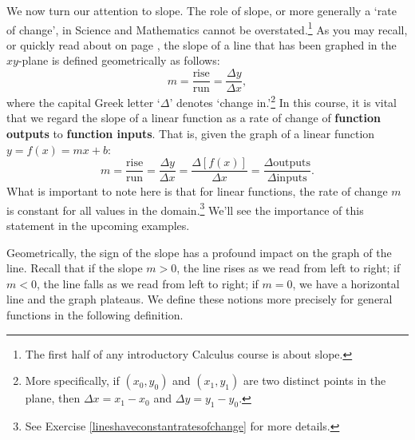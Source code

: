\documentclass{ximera}
\begin{document}
We now turn our attention to slope.  The role of slope, or more generally a `rate of change',  in Science and Mathematics  cannot be overstated.\footnote{The first half of any introductory Calculus course is about slope.} As you may recall, or quickly read about on page \pageref{slope}, the slope of a line that has been graphed in the $xy$-plane is defined geometrically as follows: \[m = \frac{\text{rise}}{\text{run}} = \frac{\Delta y}{\Delta x} ,\] where the capital Greek letter  `$\Delta$' denotes `change in.'\footnote{More specifically, if $(x_{0}, y_{0})$ and $(x_{1}, y_{1})$ are two distinct points in the plane, then $\Delta x = x_{1} - x_{0}$ and $\Delta y = y_{1} - y_{0}$.} In this course, it is vital that we regard the slope of a linear function as a  rate of change of \textbf{function outputs}  to \textbf{function inputs}.  That is, given the graph of a linear function $y = f(x) = mx + b$:   \[ m = \frac{\text{rise}}{\text{run}} = \frac{\Delta y}{\Delta x} = \frac{\Delta [f(x)]}{\Delta x} = \frac{\Delta \text{outputs}}{\Delta \text{inputs}}. \]  What is important to note here is that for linear functions, the rate of change $m$ is constant for all values in the domain.\footnote{See Exercise \ref{lineshaveconstantratesofchange} for more details.}  We'll see the importance of this statement in the upcoming examples.



Geometrically, the sign of the slope has a profound impact on the graph of the line.  Recall that if the slope $m > 0$, the line rises as we read from left to right;   if $m<0$, the line falls as we read from left to right; if $m=0$, we have a horizontal line and the graph plateaus.  We define these notions more precisely for general functions in the following definition.

\end{document}
